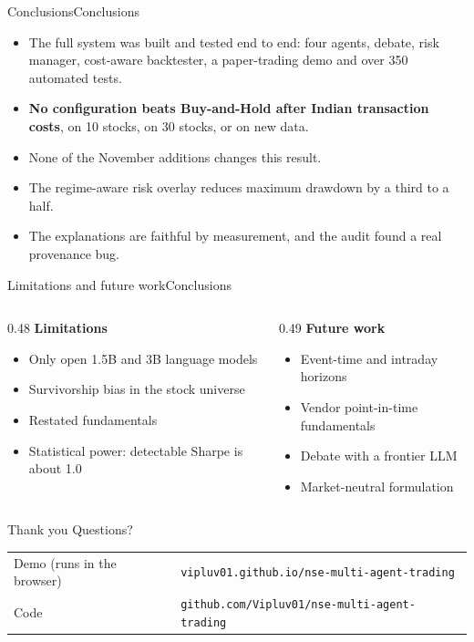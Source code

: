 \documentclass[aspectratio=169,11pt]{beamer}
\newenvironment{pts}{\begin{itemize}\setlength{\itemsep}{0.6em}}{\end{itemize}}
\newcommand{\lead}[1]{{\small\bfseries\color{accent}#1}\par\vspace{0.35em}}
\begin{document}
\begin{frame}{Conclusions\hfill{\normalfont\footnotesize\color{muted}Conclusions}}

\begin{pts}
\item The full system was built and tested end to end: four agents, debate, risk manager, cost-aware backtester, a paper-trading demo and over 350 automated tests.
\item \textbf{No configuration beats Buy-and-Hold after Indian transaction costs}, on 10 stocks, on 30 stocks, or on new data.
\item None of the November additions changes this result.
\item The regime-aware risk overlay reduces maximum drawdown by a third to a half.
\item The explanations are faithful by measurement, and the audit found a real provenance bug.
\end{pts}
\end{frame}

\begin{frame}{Limitations and future work\hfill{\normalfont\footnotesize\color{muted}Conclusions}}
\begin{columns}[t]\begin{column}{0.48\textwidth}
\lead{Limitations}
\begin{itemize}\setlength{\itemsep}{0.45em}\small
\item Only open 1.5B and 3B language models
\item Survivorship bias in the stock universe
\item Restated fundamentals
\item Statistical power: detectable Sharpe is about 1.0
\end{itemize}\end{column}\begin{column}{0.49\textwidth}
\lead{Future work}
\begin{itemize}\setlength{\itemsep}{0.45em}\small
\item Event-time and intraday horizons
\item Vendor point-in-time fundamentals
\item Debate with a frontier LLM
\item Market-neutral formulation
\end{itemize}\end{column}\end{columns}
\end{frame}

\begin{frame}{Thank you}
\vspace{1.2em}
{\large Questions?}\par\vspace{2.2em}
\small\renewcommand{\arraystretch}{1.5}
\begin{tabular}{@{}ll@{}}
\textcolor{muted}{Demo (runs in the browser)} & \texttt{vipluv01.github.io/nse-multi-agent-trading}\\
\textcolor{muted}{Code} & \texttt{github.com/Vipluv01/nse-multi-agent-trading}
\end{tabular}
\end{frame}
\end{document}
